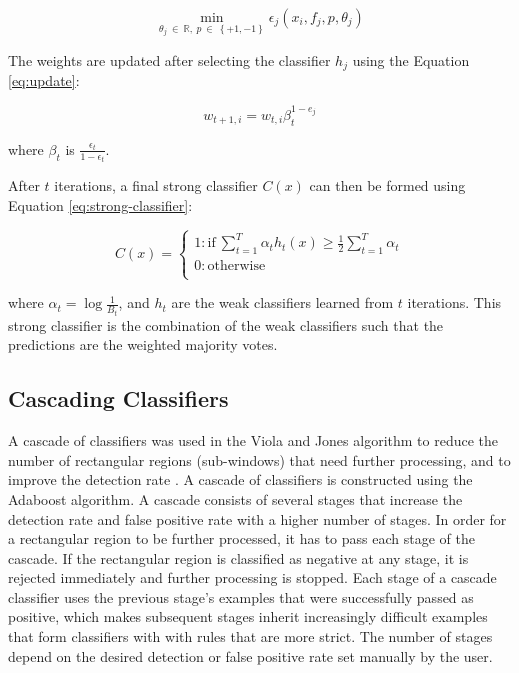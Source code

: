 \begin{equation} \label{eq:minimize}
\min_{\theta_j \ \in \ \mathbb{R}, \ p \ \in \ \left\{ +1,-1 \right\}}\epsilon_j(x_i, f_j, p, \theta_j)
\end{equation}

The weights are updated after selecting the classifier $h_j$ using the Equation \ref{eq:update}:
    
\begin{equation} \label{eq:update}
w_{t+1,i} = w_{t,i} \beta_t^{1-e_j}
\end{equation}
    
where $\beta_t$ is $\frac{\epsilon_t}{1-\epsilon_t}$.

After $t$ iterations, a final strong classifier $C(x)$ can then be formed using Equation \ref{eq:strong-classifier}:

\begin{equation} \label{eq:strong-classifier}
C(x) = 
\begin{cases}
    1: \text{if} \ \sum_{t=1}^T{\alpha_t h_t(x) \geq \frac{1}{2} \sum_{t=1}^T{\alpha_t}} \\
    0: \text{otherwise} \\
\end{cases}
\end{equation}

where $\alpha_t = \log \frac{1}{B_t}$, and $h_t$ are the weak classifiers learned from $t$ iterations. This strong classifier is the combination of the weak classifiers such that the predictions are the weighted majority votes.

\subsection{Cascading Classifiers} \label{cascading-classifiers}

A cascade of classifiers was used in the Viola and Jones algorithm to reduce the number of rectangular regions (sub-windows) that need further processing, and to improve the detection rate \cite{Viola:2004}. A cascade of classifiers is constructed using the Adaboost algorithm. A cascade consists of several stages that increase the detection rate and false positive rate with a higher number of stages. In order for a rectangular region to be further processed, it has to pass each stage of the cascade. If the rectangular region is classified as negative at any stage, it is rejected immediately and further processing is stopped. Each stage of a cascade classifier uses the previous stage's examples that were successfully passed as positive, which makes subsequent stages inherit increasingly difficult examples that form classifiers with with rules that are more strict. The number of stages depend on the desired detection or false positive rate set manually by the user.

